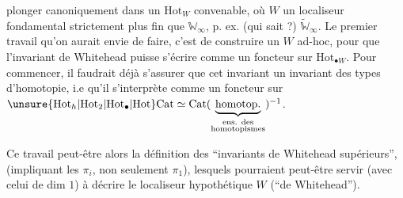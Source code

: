 plonger canoniquement dans un $\mathrm{Hot}_W$ convenable, où $W$  un localiseur fondamental strictement plus fin que $\mathbb W_\infty$, p. ex. (qui sait ?) $\widetilde{\mathbb W}_\infty$. Le premier travail qu'on aurait envie de faire, c'est de construire un  $W$ ad-hoc, pour que l'invariant de Whitehead puisse s'écrire comme un foncteur sur $\mathrm{Hot}_{\bullet W}$. Pour commencer, il faudrait déjà s'assurer que cet invariant    un invariant des types d'homotopie, i.e qu'il s'interprète comme un foncteur sur $\unsure{\mathrm{Hot}_h|\mathrm{Hot}_2|\mathrm{Hot}_\bullet|\mathrm{Hot}}\mathrm{Cat}\simeq\mathrm{Cat}(\underbrace{\mathrm{homotop.}}_{\substack{\text{ens. des}\\\text{homotopismes}}})^{-1}$.

Ce travail  peut-être alors la définition des ``invariants de Whitehead supérieurs'', (impliquant les $\pi_i$, non seulement  $\pi_1$), lesquels pourraient peut-être servir (avec celui de dim $1$) à décrire le localiseur hypothétique $W$ (``de Whitehead'').
